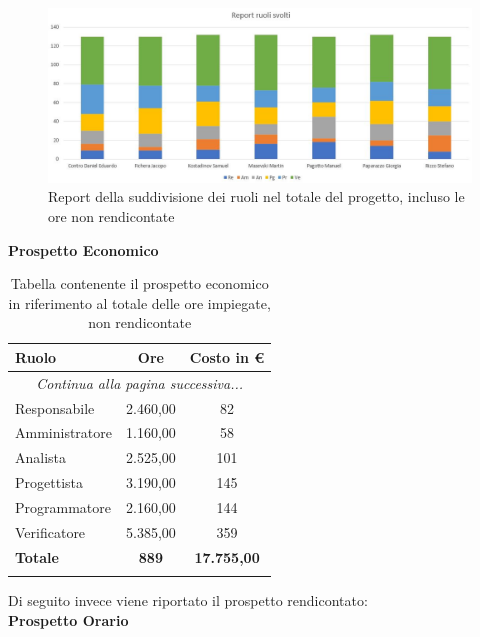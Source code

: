 \documentclass[../piano_di_progetto.tex]{subfiles}
\begin{document}
\begin{figure}[H]
\centering
\includegraphics[width=12cm]{componenti/img/report_ruoli_tot}
\caption{Report della suddivisione dei ruoli nel totale del progetto, incluso le ore non rendicontate}
\end{figure}

\textbf{Prospetto Economico}

\begin{center}
	\begin{longtable}{|l|c|c|}
		\hline
		\rowcolor{lightgray}
		\textbf{Ruolo} & \textbf{Ore} & \textbf{Costo in €}\\
		\hline
		\endhead
		
		\hline
		\multicolumn{3}{|c|}{\emph{Continua alla pagina successiva...}}\\
		\hline
		\endfoot

		\endlastfoot
		
		Responsabile & 2.460,00 & 82 \\
		Amministratore & 1.160,00 & 58 \\
		Analista & 2.525,00 & 101 \\
		Progettista & 3.190,00 & 145 \\
		Programmatore & 2.160,00 & 144 \\
		Verificatore & 5.385,00 & 359 \\
		\hline
		\textbf{Totale} & \textbf{889} & \textbf{17.755,00}\\
		\hline

		\caption{Tabella contenente il prospetto economico in riferimento al totale delle ore impiegate, non rendicontate}
	\end{longtable}
\end{center}


Di seguito invece viene riportato il prospetto rendicontato:\\

\textbf{Prospetto Orario}
\end{document}
